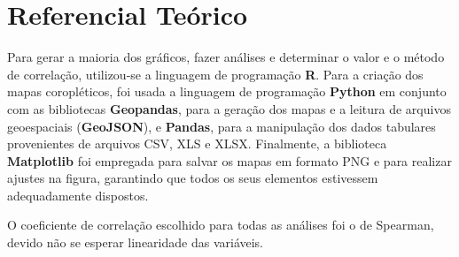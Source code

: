 \chapter{Referencial Teórico}

Para gerar a maioria dos gráficos, fazer análises e determinar o valor e o método de correlação, utilizou-se a linguagem de programação \textbf{R}. Para a criação dos mapas coropléticos, foi usada a linguagem de programação \textbf{Python} em conjunto com as bibliotecas \textbf{Geopandas}, para a geração dos mapas e a leitura de arquivos geoespaciais (\textbf{GeoJSON}), e \textbf{Pandas}, para a manipulação dos dados tabulares provenientes de arquivos CSV, XLS e XLSX. Finalmente, a biblioteca \textbf{Matplotlib} foi empregada para salvar os mapas em formato PNG e para realizar ajustes na figura, garantindo que todos os seus elementos estivessem adequadamente dispostos.

O coeficiente de correlação escolhido para todas as análises foi o de Spearman, devido não se esperar linearidade das variáveis.